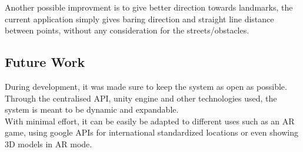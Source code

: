 Another possible improvment is to give better direction towards landmarks, the current application simply gives baring direction and straight line distance between points,
 without any consideration for the streets/obstacles.
\subsection{Future Work}
During development, it was made sure to keep the system as open as possible. Through the 
centralised API, unity engine and other technologies used, the system is meant to be dynamic and 
expandable.\\
With minimal effort, it can be easily be adapted to different uses such as an AR game, 
using google APIs for international standardized locations or even showing 3D models in AR mode. 

